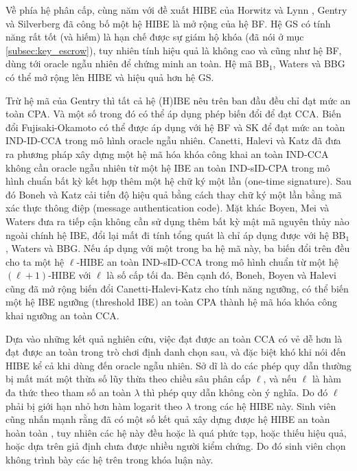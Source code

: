 \documentclass[class=report, crop=false]{standalone}
\begin{document}
		Về phía hệ phân cấp, cùng năm với đề xuất HIBE của Horwitz và Lynn \cite{DBLP:conf/eurocrypt/HorwitzL02}, Gentry và Silverberg \cite{DBLP:conf/asiacrypt/GentryS02} đã công bố một hệ HIBE là mở rộng của hệ BF. Hệ GS có tính năng rất tốt (và hiếm) là hạn chế được sự giám hộ khóa (đã nói ở mục \ref{subsec:key_escrow}), tuy nhiên tính hiệu quả là không cao và cũng như hệ BF, dùng tới oracle ngẫu nhiên để chứng minh an toàn. Hệ mã BB$_1$, Waters và BBG có thể mở rộng lên HIBE và hiệu quả hơn hệ GS.

		Trừ hệ mã của Gentry thì tất cả hệ (H)IBE nêu trên ban đầu đều chỉ đạt mức an toàn CPA. Và một số trong đó có thể áp dụng phép biến đổi để đạt CCA. Biến đổi Fujisaki-Okamoto \cite{DBLP:conf/crypto/FujisakiO99} có thể được áp dụng với hệ BF và SK để đạt mức an toàn IND-ID-CCA trong mô hình oracle ngẫu nhiên. Canetti, Halevi và Katz \cite{DBLP:conf/eurocrypt/CanettiHK04} đã đưa ra phương pháp xây dựng một hệ mã hóa khóa công khai an toàn IND-CCA không cần oracle ngẫu nhiên từ một hệ IBE an toàn IND-sID-CPA trong mô hình chuẩn bất kỳ kết hợp thêm một hệ chữ ký một lần (one-time signature). Sau đó Boneh và Katz \cite{DBLP:conf/ctrsa/BonehK05} cải tiến độ hiệu quả bằng cách thay chữ ký một lần bằng mã xác thực thông điệp (message authentication code). Mặt khác Boyen, Mei và Waters \cite{DBLP:conf/ccs/BoyenMW05} đưa ra tiếp cận không cần sử dụng thêm bất kỳ mật mã nguyên thủy nào ngoài chính hệ IBE, đổi lại mất đi tính tổng quát là chỉ áp dụng được với hệ BB$_1$, Waters và BBG. Nếu áp dụng với một trong ba hệ mã này, ba biến đổi trên đều cho ta một hệ $\ell$-HIBE an toàn IND-sID-CCA trong mô hình chuẩn từ một hệ $(\ell + 1)$-HIBE với $\ell$ là số cấp tối đa. Bên cạnh đó, Boneh, Boyen và Halevi \cite{DBLP:conf/ctrsa/BonehBH06} cũng đã mở rộng biến đổi Canetti-Halevi-Katz cho tính năng ngưỡng, có thể biến một hệ IBE ngưỡng (threshold IBE) an toàn CPA thành hệ mã hóa khóa công khai ngưỡng an toàn CCA.

		Dựa vào những kết quả nghiên cứu, việc đạt được an toàn CCA có vẻ dễ hơn là đạt được an toàn trong trò chơi định danh chọn sau, và đặc biệt khó khi nói đến HIBE kể cả khi dùng đến oracle ngẫu nhiên. Sở dĩ là do các phép quy dẫn thường bị mất mát một thừa số lũy thừa theo chiều sâu phân cấp $\ell$, và nếu $\ell$ là hàm đa thức theo tham số an toàn $\lambda$ thì phép quy dẫn không còn ý nghĩa. Do đó $\ell$ phải bị giới hạn nhỏ hơn hàm logarit theo $\lambda$ trong các hệ HIBE này. Sinh viên cũng nhấn mạnh rằng đã có một số kết quả xây dựng được hệ HIBE an toàn hoàn toàn \cite{DBLP:conf/tcc/GentryH09, DBLP:conf/crypto/Waters09, DBLP:conf/tcc/LewkoW10, DBLP:journals/jise/HuWXY14}, tuy nhiên các hệ này đều hoặc là quá phức tạp, hoặc thiếu hiệu quả, hoặc dựa trên giả định chưa được nhiều người kiểm chứng. Do đó sinh viên chọn không trình bày các hệ trên trong khóa luận này.
		
\end{document}
